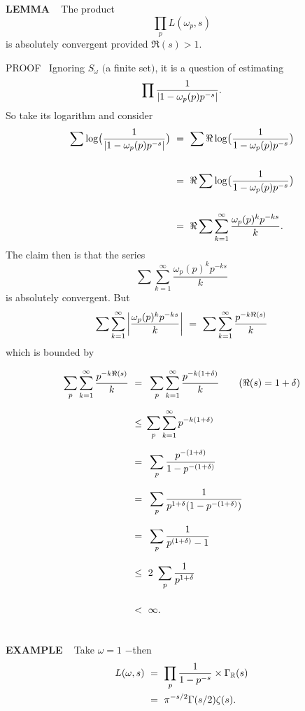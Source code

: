 \begin{x}{\small\bf LEMMA} \ %
The product
\[
\prod_p L(\omega_p,s)
\]
is absolutely convergent provided $\Re (s) > 1$.

\vspace{0.1cm}

PROOF \ 
Ignoring $S_\omega$ $($a finite set$)$, it is a question of estimating
\[
\prod \frac{1}{\left\vert 1 - \omega_p(p) p^{-s}\right\vert}.
\]
So take its logarithm and consider
\allowdisplaybreaks
\begin{align*}
\sum \log \bigl(\frac{1}{\left\vert 1 - \omega_p(p) p^{-s}\right\vert}\bigr) \ 	
&=\  \sum \Re \log \bigl(\frac{1}{ 1 - \omega_p(p) p^{-s}}\bigr)\\
&\\
&=\  \Re \sum \log \bigl(\frac{1}{ 1 - \omega_p(p) p^{-s}}\bigr)\\
&\\	
&=\  \Re \sum \sum_{k = 1}^\infty \frac{\omega_p(p)^k p^{-ks}}{k}.	
\end{align*}
The claim then is that the series
\[
\sum \sum_{k = 1}^\infty \frac{\omega_p(p)^k p^{-ks}}{k}
\]
is absolutely convergent.  
But
\[
\sum \sum_{k = 1}^\infty \left\vert\frac{\omega_p(p)^k p^{-ks}}{k}\right\vert \ =\   \sum \sum_{k = 1}^\infty \frac{p^{-k\Re(s)}}{k}
\]
which is bounded by

\allowdisplaybreaks
\begin{align*}
\sum\limits_p \sum_{k = 1}^\infty \frac{p^{-k\Re(s)}}{k} \ 
&=\vsx\  \sum\limits_p \sum_{k = 1}^\infty \frac{p^{-k(1 + \delta)}}{k}	\qquad (\Re(s) = 1 + \delta)\\	
&\le\vsx \sum\limits_p \sum_{k = 1}^\infty p^{-k(1 + \delta)}\\	
&=\vsx\  \sum\limits_p \frac{p^{-(1 + \delta)}}{1 - p^{-(1 + \delta)}}\\	
&=\vsx\  \sum\limits_p \frac{1}{p^{1 + \delta}(1 - p^{-(1 + \delta)})}\\	
&=\vsx\  \sum\limits_p \frac{1}{p^{(1 + \delta)} - 1}\\	
&\le\vsx\  2 \ \sum\limits_p \frac{1}{p^{1 + \delta}}\\	
&<\vsx \  \infty.
\end{align*}
\end{x}

\begin{x}{\small\bf EXAMPLE} \ %
Take $\omega = 1$ $-$then
\begin{align*}
L(\omega,s) \ 
&=\  \prod_p \frac{1}{1 - p^{-s}} \times \Gamma_\R(s)\\ 
&=\  \pi^{-s/2} \Gamma(s/2) \zeta(s).
\end{align*}
\end{x}

